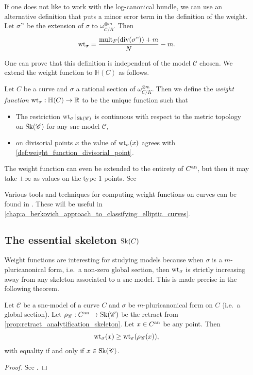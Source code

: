 \begin{remark}
	If one does not like to work with the log-canonical bundle, we can use an alternative definition that puts a minor error term in the definition of the weight. 
	Let $\sigma"$ be the extension of $\sigma$ to $\omega_{\mathscr C / R}^{\otimes m}$. Then \[
		\operatorname{wt}_{\sigma} = \frac{\operatorname{mult}_F(\operatorname{div} (\sigma")) + m}{N} - m
	.\] 
\end{remark}
One can prove that this definition is independent of the model $\mathscr C$ chosen. 
We extend the weight function to $\mathbb{H}(C)$ as follows.
\begin{definition}\label{def:weight_function}
	Let $C$ be a curve and $\sigma$ a rational section of $\omega_{C / K}^{\otimes m}$. 
	Then we define the \emph{weight function} $\operatorname{wt}_{\sigma}: \mathbb{H}(C) \to \mathbb{R}$ to be the unique function such that 
	\begin{itemize}
		\item The restriction $\operatorname{wt}_{\sigma}|_{\operatorname{Sk}(\mathscr C)}$ is continuous with respect to the metric topology on $\operatorname{Sk}(\mathscr C)$ for any snc-model $\mathscr C$, 
		\item on divisorial points $x$ the value of $\operatorname{wt}_{\sigma}(x)$ agrees with \cref{def:weight_function_divisorial_point}.
	\end{itemize}
\end{definition}

The weight function can even be extended to the entirety of $C{}^{\text{an}}$, but then it may take $\pm \infty$ as values on the type 1 points. See \cite[§4.5.4]{mustataWeightFunctionsNonArchimedean2015}


Various tools and techniques for computing weight functions on curves can be found in \cite{bakerWeightFunctionsBerkovich2016}. 
These will be useful in \cref{chap:a_berkovich_approach_to_classifying_elliptic_curves}. 

\subsection{The essential skeleton $\sk(C)$}\label{sec:the_essential_skeleton_sk_c$}

Weight functions are interesting for studying models because when $\sigma$ is a $m$-pluricanonical form, i.e.\ a non-zero global section, then $\operatorname{wt}_\sigma$ is strictly increasing away from any skeleton associated to a snc-model. 
This is made precise in the following theorem. 
\begin{proposition}\label{prop:weight_function_increase}
	Let $\mathscr C$ be a snc-model of a curve $C$ and $\sigma$ be $m$-pluricanonical form on $C$ (i.e.\ a global section).
	Let $\rho_{\mathscr C}: C{}^{\text{an}} \to \operatorname{Sk}(\mathscr C)$ be the retract from \cref{prop:retract_analytification_skeleton}. 
	Let $x \in C{}^{\text{an}} $ be any point. 
	Then \[
		\operatorname{wt}_\sigma(x) \ge \operatorname{wt}_\sigma(\rho_{\mathscr C}(x))
	,\] 
	with equality if and only if $x \in \operatorname{Sk}(\mathscr C)$. 
\end{proposition}
\begin{proof}
	See \cite[prop.\ 4.4.4]{mustataWeightFunctionsNonArchimedean2015}. 
\end{proof}

